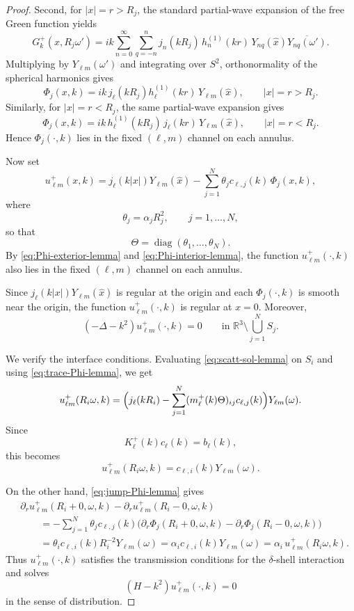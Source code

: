 \documentclass[10pt,a4paper]{amsart}
\newcommand{\R}{\mathbb{R}}
\newcommand{\diag}{\operatorname{diag}}
\newcommand{\hj}[1]{h^{(1)}_{#1}}
\newcommand{\jj}[1]{j_{#1}}
\begin{document}
\begin{proof}
Second, for $|x|=r>R_j$, the standard partial-wave expansion of the free Green
function yields
\[
G_k^+(x,R_j\omega')
=
ik\sum_{n=0}^\infty \sum_{q=-n}^n
j_n(kR_j)\,h_n^{(1)}(kr)\,
Y_{nq}(\widehat x)\overline{Y_{nq}(\omega')}.
\]
Multiplying by $Y_{\ell m}(\omega')$ and integrating over $S^2$, orthonormality of
the spherical harmonics gives
\begin{equation}\label{eq:Phi-exterior-lemma}
\Phi_j(x,k)
=
ik\,\jj{\ell}(kR_j)\hj{\ell}(kr)\,Y_{\ell m}(\widehat x),
\qquad |x|=r>R_j.
\end{equation}
Similarly, for $|x|=r<R_j$, the same partial-wave expansion gives
\begin{equation}\label{eq:Phi-interior-lemma}
\Phi_j(x,k)
=
ik\,\hj{\ell}(kR_j)\,\jj{\ell}(kr)\,Y_{\ell m}(\widehat x),
\qquad |x|=r<R_j.
\end{equation}
Hence $\Phi_j(\cdot,k)$ lies in the fixed $(\ell,m)$ channel on each annulus.

Now set
\begin{equation}\label{eq:scatt-sol-lemma}
u_{\ell m}^+(x,k)
=
\jj{\ell}(k|x|)Y_{\ell m}(\widehat x)
-
\sum_{j=1}^N \theta_j c_{\ell,j}(k)\,\Phi_j(x,k),
\end{equation}
where
\[
\theta_j=\alpha_jR_j^2,
\qquad j=1,\ldots,N,
\]
so that
\[
\Theta=\diag(\theta_1,\ldots,\theta_N).
\]
By \eqref{eq:Phi-exterior-lemma} and \eqref{eq:Phi-interior-lemma},
the function $u_{\ell m}^+(\cdot,k)$ also lies in the fixed $(\ell,m)$
channel on each annulus.

Since $\jj{\ell}(k|x|)Y_{\ell m}(\widehat x)$ is regular at the origin and each
$\Phi_j(\cdot,k)$ is smooth near the origin, the function
$u_{\ell m}^+(\cdot,k)$ is regular at $x=0$. Moreover,
\[
(-\Delta-k^2)u_{\ell m}^+(\cdot,k)=0
\qquad \text{in }\R^3\setminus\bigcup_{j=1}^N S_j.
\]

We verify the interface conditions. Evaluating
\eqref{eq:scatt-sol-lemma} on $S_i$ and using
\eqref{eq:trace-Phi-lemma}, we get
\[
u_{\ell m}^+(R_i\omega,k)
=
\Bigl(
\jj{\ell}(kR_i)-\sum_{j=1}^N (m_\ell^+(k)\Theta)_{ij}c_{\ell,j}(k)
\Bigr)Y_{\ell m}(\omega).
\]
Since
\[
K_\ell^+(k)c_\ell(k)=b_\ell(k),
\]
this becomes
\[
u_{\ell m}^+(R_i\omega,k)=c_{\ell,i}(k)Y_{\ell m}(\omega).
\]

On the other hand, \eqref{eq:jump-Phi-lemma} gives
\begin{align*}
&\partial_r u_{\ell m}^+(R_i+0,\omega,k)
-
\partial_r u_{\ell m}^+(R_i-0,\omega,k)
\\
&\qquad
=
-\sum_{j=1}^N \theta_j c_{\ell,j}(k)
\bigl(
\partial_r\Phi_j(R_i+0,\omega,k)
-
\partial_r\Phi_j(R_i-0,\omega,k)
\bigr)
\\
&\qquad
=
\theta_i c_{\ell,i}(k)R_i^{-2}Y_{\ell m}(\omega)
=
\alpha_i c_{\ell,i}(k)Y_{\ell m}(\omega)
=
\alpha_i\,u_{\ell m}^+(R_i\omega,k).
\end{align*}
Thus $u_{\ell m}^+(\cdot,k)$ satisfies the transmission conditions for the
$\delta$-shell interaction and solves
\[
(H-k^2)u_{\ell m}^+(\cdot,k)=0
\]
in the sense of distribution.


\end{proof}
\end{document}
